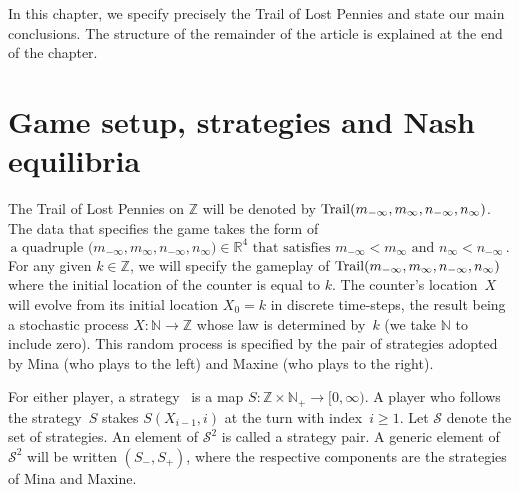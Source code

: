 \documentclass[letterpaper,11pt,oneside,reqno]{amsbook}
\newcommand{\N}{\ensuremath{\mathbb{N}}}
\newcommand{\R}{\ensuremath{\mathbb{R}}}
\newcommand{\Z}{\ensuremath{\mathbb{Z}}}
\numberwithin{figure}{chapter}
\theoremstyle{definition}
\theoremstyle{definition}
\theoremstyle{definition}
\theoremstyle{definition}
\theoremstyle{definition}
\newcommand{\mc}{\mathcal}
\newcommand{\nwithzero}{\N}
\newcommand{\nwithoutzero}{\N_+}
\newcommand{\game}{{\rm Trail}}
\def\hfff#1{\label{#1}}
\begin{document}
In this chapter, we specify precisely the Trail of Lost Pennies and state our main conclusions. The structure of the remainder of the article is explained at the end of the chapter.

 


\section{Game setup, strategies and Nash equilibria}\label{s.gamespec}

The Trail of Lost Pennies on $\Z$ will be denoted by $\game(m_{-\infty},m_\infty,n_{-\infty},n_\infty)$. 
The data that specifies the game takes the form of 
\begin{equation}\label{e.quadruple}
\textrm{a quadruple $\big(m_{-\infty},m_\infty,n_{-\infty},n_\infty \big) \in \R^4$ that satisfies  $m_{-\infty} < m_\infty$ and $n_\infty < n_{-\infty}$} \, .
\end{equation}
For any given $k \in \Z$, we will specify the gameplay of $\game(m_{-\infty},m_\infty,n_{-\infty},n_\infty)$ where the initial location of the counter is equal to $k$.
The counter's location~$X$ will evolve from its initial location $X_0 = k$ in discrete time-steps, the result being a stochastic process $X:\nwithzero \to \Z$ whose law is determined by~$k$ (we take $\N$ to include zero).\hfff{withandwithout} 
This random process is specified by the pair of strategies adopted by Mina (who plays to the left) and Maxine (who plays to the right). 


For either player, a strategy~\hfff{strategy} is a map $S:\Z \times \nwithoutzero \to [0,\infty)$. A player who follows the strategy~$S$ stakes $S(X_{i-1},i)$ at the turn with index~$i \geq 1$. 
Let $\mc{S}$ denote the set of strategies. An element of $\mc{S}^2$ is called a strategy pair. A generic element of $\mc{S}^2$ will be written $(S_-,S_+)$, where the respective components are the strategies of Mina and Maxine.
\end{document}
